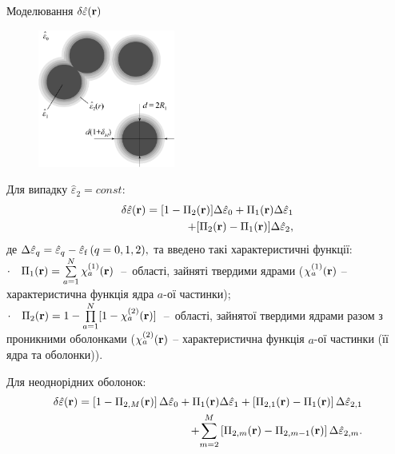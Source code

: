 \documentclass[10pt]{beamer}
\begin{document}
\begin{frame}{Моделювання $\delta\hat{\varepsilon}({\bf r})$}
\footnotesize

\begin{figure}
\vspace{-20pt}
  \begin{center}
    \includegraphics[width=0.4\textwidth]{images/Fig1_Microstructure_new5.eps}
  \end{center}
\vspace{-30pt}
\end{figure}

Для випадку $\hat{\varepsilon}_2 = const$:
\begin{equation*}
\begin{split}
    \delta\hat{\varepsilon}({\bf r}) = [1 - \Pi_2({\bf r})]\Delta\hat{\varepsilon}_0 + \Pi_1({\bf r}) \Delta\hat{\varepsilon}_1\\ 
    + [\Pi_2({\bf r}) - \Pi_1({\bf r})]\Delta\hat{\varepsilon}_2,
\end{split}
\end{equation*}
де $\Delta\hat{\varepsilon}_q = \hat{\varepsilon}_{q} - \hat{\varepsilon}_{\rm f}\, (q=0,1,2),$ та введено такі характеристичні функції: \\
$\cdot\quad \Pi_1 ({\bf r}) = \sum\limits_{a=1}^N \chi_a^{(1)} ({\bf r})$~--~області, зайняті твердими ядрами ($\chi_a^{(1)}({\bf r})$ -- характеристична функція ядра $a$-ої частинки);\\
$\cdot\quad \Pi_2 ({\bf r}) = 1 - \prod\limits_{a=1}^N [1 - \chi_a^{(2)} ({\bf r})]$~--~області, зайнятої твердими ядрами разом з проникними оболонками ($\chi_a^{(2)}({\bf r})$ -- характеристична функція $a$-ої частинки (її ядра та оболонки)).

Для неоднорідних оболонок:
\begin{equation*}
\begin{split}
\delta\hat{\varepsilon} ({\bf r}) = \left[1- \Pi_{2,M}({\bf
r})\right] \Delta\hat{\varepsilon}_0
+ \Pi_1({\bf r}) \Delta\hat{\varepsilon}_1
+  \left[\Pi_{2,1}({\bf r})
-\Pi_1({\bf r})  \right] \Delta\hat{\varepsilon}_{2,1} \\
+ {\sum\limits_{m=2}^M  \left[ \Pi_{2,m}({\bf r}) -
\Pi_{2,m-1}({\bf r}) \right] \Delta\hat{\varepsilon}_{2,m}}.
\end{split}
\end{equation*}


\end{frame}
\end{document}
